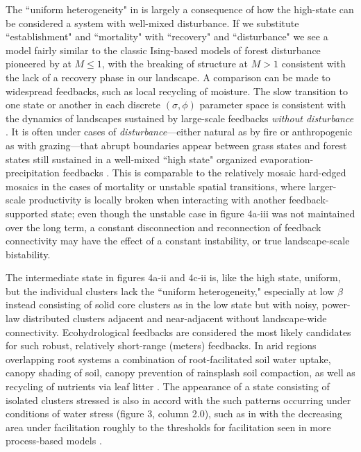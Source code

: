 \documentclass[10pt]{article}
\begin{document}
\begin{linenumbers}
The ``uniform heterogeneity" in is largely a consequence of how the high-state can be considered a system with well-mixed disturbance. If we substitute ``establishment" and ``mortality" with ``recovery" and ``disturbance" we see a model fairly similar to the classic Ising-based models of forest disturbance pioneered by \citet{Katori1998} at $M \le 1$, with the breaking of structure at $M > 1$ consistent with the lack of a recovery phase in our landscape. A comparison can be made to widespread feedbacks, such as local recycling of moisture. The slow transition to one state or another in each discrete $(\sigma, \phi)$ parameter space is consistent with the dynamics of landscapes sustained by large-scale feedbacks \textit{without disturbance} \citep{Ahlstrom2017}. It is often under cases of \textit{disturbance}---either natural as by fire or anthropogenic as with grazing---that abrupt boundaries appear between grass states and forest states still sustained in a well-mixed ``high state" organized evaporation-precipitation feedbacks \citep{Oliveras2016}. This is comparable to the relatively mosaic hard-edged mosaics in the cases of mortality or unstable spatial transitions, where larger-scale productivity is locally broken when interacting with another feedback-supported state; even though the unstable case in figure 4a-iii was not maintained over the long term, a constant disconnection and reconnection of feedback connectivity may have the effect of a constant instability, or true landscape-scale bistability.

The intermediate state in figures 4a-ii and 4c-ii is, like the high state, uniform, but the individual clusters lack the ``uniform heterogeneity," especially at low $\beta$ instead consisting of solid core clusters as in the low state but with noisy, power-law distributed clusters adjacent and near-adjacent without landscape-wide connectivity. Ecohydrological feedbacks are considered the most likely candidates for such robust, relatively short-range (meters) feedbacks. In arid regions overlapping root systems a combination of root-facilitated soil water uptake, canopy shading of soil, canopy prevention of rainsplash soil compaction, as well as recycling of nutrients via leaf litter \citep{DOdorico2007,DOdorico2005,Scanlon2007,Caylor2006,Wainwright2009}.  The appearance of a state consisting of isolated clusters  stressed is also in accord with the such patterns occurring under conditions of water stress (figure 3, column 2.0), such as in with the decreasing area under facilitation roughly to the thresholds for facilitation seen in more process-based models \citep{Caylor2006,DOdorico2005}. 


\end{linenumbers}
\end{document}
